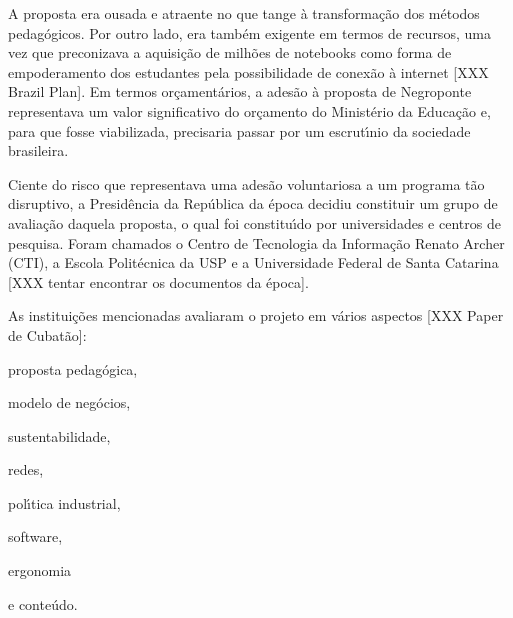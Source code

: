 \documentclass[
12pt,		%
openright,	%
twoside,  %
a4paper,			%
chapter=TITLE,		%
english,			%
french,				%
spanish,			%
brazil				%
]{USPSC-classe/USPSC}
\begin{document}
A proposta era ousada e atraente no que tange \`a transforma\c{c}\~ao dos m\'etodos pedag\'ogicos. Por outro lado, era tamb\'em exigente em termos de recursos, uma vez que preconizava a aquisi\c{c}\~ao de milh\~oes de notebooks como forma de empoderamento dos estudantes pela possibilidade de conex\~ao \`a internet [XXX Brazil Plan]. Em termos or\c{c}ament\'arios, a ades\~ao \`a proposta de Negroponte representava um valor significativo do or\c{c}amento do Minist\'erio da Educa\c{c}\~ao e, para que fosse viabilizada, precisaria passar por um escrut\'{\i}nio da sociedade brasileira.














Ciente do risco que representava uma ades\~ao voluntariosa a um programa t\~ao disruptivo, a Presid\^encia da Rep\'ublica da \'epoca decidiu constituir um grupo de avalia\c{c}\~ao  daquela proposta, o  qual foi constitu\'{\i}do por universidades e centros de pesquisa. Foram chamados o Centro de Tecnologia da Informa\c{c}\~ao Renato Archer (CTI), a Escola Polit\'ecnica da USP e a Universidade Federal de Santa Catarina [XXX tentar encontrar os documentos da \'epoca]. 














As institui\c{c}\~oes mencionadas avaliaram o projeto em v\'arios aspectos [XXX Paper de Cubat\~ao]:















\begin{alineas}
\item proposta pedag\'ogica,
\item modelo de neg\'ocios,
\item sustentabilidade,
\item redes,
\item pol\'{\i}tica industrial,
\item software,
\item ergonomia
\item e conte\'udo.
\end{alineas}
\end{document}
